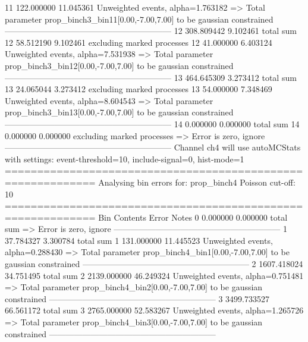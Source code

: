 11         122.000000      11.045361       Unweighted events, alpha=1.763182
  => Total parameter prop_binch3_bin11[0.00,-7.00,7.00] to be gaussian constrained
------------------------------------------------------------
12         308.809442      9.102461        total sum                     
12         58.512190       9.102461        excluding marked processes    
12         41.000000       6.403124        Unweighted events, alpha=7.531938
  => Total parameter prop_binch3_bin12[0.00,-7.00,7.00] to be gaussian constrained
------------------------------------------------------------
13         464.645309      3.273412        total sum                     
13         24.065044       3.273412        excluding marked processes    
13         54.000000       7.348469        Unweighted events, alpha=8.604543
  => Total parameter prop_binch3_bin13[0.00,-7.00,7.00] to be gaussian constrained
------------------------------------------------------------
14         0.000000        0.000000        total sum                     
14         0.000000        0.000000        excluding marked processes    
  => Error is zero, ignore      
------------------------------------------------------------
Channel ch4 will use autoMCStats with settings: event-threshold=10, include-signal=0, hist-mode=1
============================================================
Analysing bin errors for: prop_binch4
Poisson cut-off: 10
============================================================
Bin        Contents        Error           Notes                         
0          0.000000        0.000000        total sum                     
  => Error is zero, ignore      
------------------------------------------------------------
1          37.784327       3.300784        total sum                     
1          131.000000      11.445523       Unweighted events, alpha=0.288430
  => Total parameter prop_binch4_bin1[0.00,-7.00,7.00] to be gaussian constrained
------------------------------------------------------------
2          1607.418024     34.751495       total sum                     
2          2139.000000     46.249324       Unweighted events, alpha=0.751481
  => Total parameter prop_binch4_bin2[0.00,-7.00,7.00] to be gaussian constrained
------------------------------------------------------------
3          3499.733527     66.561172       total sum                     
3          2765.000000     52.583267       Unweighted events, alpha=1.265726
  => Total parameter prop_binch4_bin3[0.00,-7.00,7.00] to be gaussian constrained
------------------------------------------------------------
